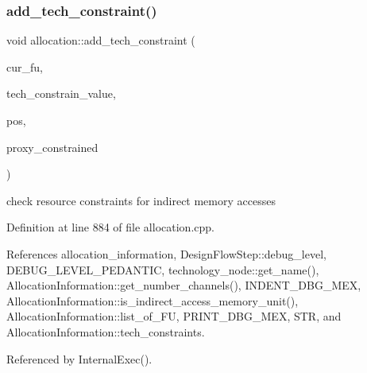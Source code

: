 \mbox{\label{classallocation_a8896615bea432f94fc39ba9eb56f410c}} 
\subsubsection{\texorpdfstring{add\+\_\+tech\+\_\+constraint()}{add\_tech\_constraint()}}
{\footnotesize\ttfamily void allocation\+::add\+\_\+tech\+\_\+constraint (\begin{DoxyParamCaption}\item[{\hyperlink{technology__node_8hpp_a33dd193b7bd6b987bf0d8a770a819fa7}{technology\+\_\+node\+Ref}}]{cur\+\_\+fu,  }\item[{unsigned int}]{tech\+\_\+constrain\+\_\+value,  }\item[{unsigned int}]{pos,  }\item[{bool}]{proxy\+\_\+constrained }\end{DoxyParamCaption})\hspace{0.3cm}{\ttfamily [protected]}}

check resource constraints for indirect memory accesses 

Definition at line 884 of file allocation.\+cpp.



References allocation\+\_\+information, Design\+Flow\+Step\+::debug\+\_\+level, D\+E\+B\+U\+G\+\_\+\+L\+E\+V\+E\+L\+\_\+\+P\+E\+D\+A\+N\+T\+IC, technology\+\_\+node\+::get\+\_\+name(), Allocation\+Information\+::get\+\_\+number\+\_\+channels(), I\+N\+D\+E\+N\+T\+\_\+\+D\+B\+G\+\_\+\+M\+EX, Allocation\+Information\+::is\+\_\+indirect\+\_\+access\+\_\+memory\+\_\+unit(), Allocation\+Information\+::list\+\_\+of\+\_\+\+FU, P\+R\+I\+N\+T\+\_\+\+D\+B\+G\+\_\+\+M\+EX, S\+TR, and Allocation\+Information\+::tech\+\_\+constraints.



Referenced by Internal\+Exec().

